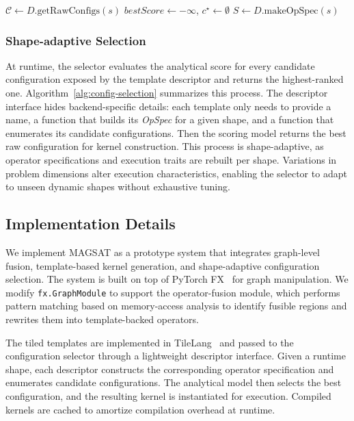 \begin{algorithm}[t]
 \caption{Shape-adaptive configuration selection.}
\label{alg:config-selection}
$\mathcal{C} \leftarrow D.\mathrm{getRawConfigs}(s)$\;
$bestScore \leftarrow -\infty$, $c^\star \leftarrow \emptyset$\;
$S \leftarrow D.\mathrm{makeOpSpec}(s)$\;
\;
\end{algorithm}
\subsubsection{Shape-adaptive Selection}
At runtime, the selector evaluates the analytical score for every candidate
configuration exposed by the template descriptor and returns the highest-ranked
one.  Algorithm~\ref{alg:config-selection} summarizes this process.  The
descriptor interface hides backend-specific details: each template only needs
to provide a name, a function that builds its \textit{OpSpec} for a given
shape, and a function that enumerates its candidate configurations.
Then the scoring model returns the best raw configuration for kernel construction.
This process is shape-adaptive, as operator specifications and execution traits 
are rebuilt per shape. Variations in problem dimensions alter execution characteristics, enabling the selector to adapt to 
unseen dynamic shapes without exhaustive tuning.

\subsection{Implementation Details}
\label{sec:impdetails}

We implement MAGSAT as a prototype system that integrates graph-level fusion,
template-based kernel generation, and shape-adaptive configuration
selection. The system is built on top of PyTorch FX~\cite{ansel2024pytorch} for graph
manipulation. 
We modify \texttt{fx.GraphModule} to support the operator-fusion module,
which performs pattern matching based on memory-access analysis to identify fusible regions and
rewrites them into template-backed operators.


The tiled templates are implemented in TileLang~\cite{cheng2025pipethreader} and passed to the
configuration selector through a lightweight descriptor interface.
Given a runtime shape, each descriptor constructs the corresponding
operator specification and enumerates candidate configurations. The
analytical model then selects the best configuration, and the resulting kernel is instantiated for execution.
Compiled kernels are cached to
amortize compilation overhead at runtime.
